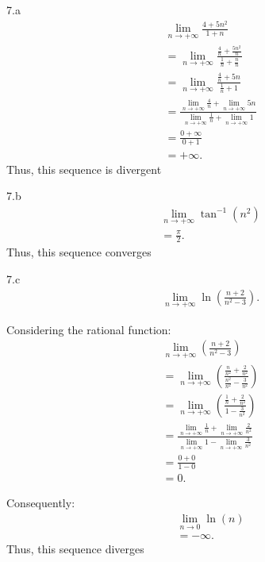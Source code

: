 \documentclass{report}
\begin{document}
    \bigbreak \noindent 
    7.a
    \begin{align*}
        &\lim\limits_{n \to +\infty}{\frac{4+5n^{2}}{1+n}} \\
        &=\lim\limits_{n \to +\infty}{\frac{\frac{4}{n}+\frac{5n^{2}}{n}}{\frac{1}{n} + \frac{n}{n}}} \\
        &=\lim\limits_{n \to +\infty}{\frac{\frac{4}{n}+5n}{\frac{1}{n}+1}} \\
        &= \frac{\lim\limits_{n \to +\infty}{\frac{4}{n}}+\lim\limits_{n \to +\infty}{5n}}{\lim\limits_{n \to +\infty}{\frac{1}{n}} + \lim\limits_{n \to +\infty}{1}} \\
        &= \frac{0 + \infty}{0 + 1} \\
        &=+\infty
    .\end{align*}
    Thus, this sequence is divergent

    \bigbreak \noindent 
    7.b
    \begin{align*}
        &\lim\limits_{n \to +\infty}{\tan^{-1}{(n^{2})}} \\
        &=\frac{\pi}{2}
    .\end{align*}
    \bigbreak \noindent 
    Thus, this sequence converges

    \bigbreak \noindent 
    7.c
    \begin{align*}
        &\lim\limits_{n \to +\infty}{\ln{\left(\frac{n+2}{n^{2}-3}\right)}} 
    .\end{align*}
    \begin{minipage}[t]{0.47\textwidth}
        Considering the rational function: 
        \begin{align*}
        &\lim\limits_{n \to +\infty}{\left(\frac{n+2}{n^{2}-3}\right)} \\
        &=\lim\limits_{n \to +\infty}{\left(\frac{\frac{n}{n^{2}}+\frac{2}{n^{2}}}{\frac{n^{2}}{n^{2}}-\frac{3}{n^{2}}}\right)} \\
        &=\lim\limits_{n \to +\infty}{\left(\frac{\frac{1}{n}+\frac{2}{n^{2}}}{1-\frac{3}{n^{2}}}\right)}\\
        &= \frac{\lim\limits_{n \to +\infty}{\frac{1}{n}}+\lim\limits_{n \to +\infty}{\frac{2}{n^{2}}}}{\lim\limits_{n \to +\infty}{1}-\lim\limits_{n \to +\infty}{\frac{3}{n^{2}}}} \\
        &=\frac{0+0}{1-0} \\
        &=0
    .\end{align*}
    \end{minipage}
    \begin{minipage}[t]{0.47\textwidth}
        Consequently:
        \begin{align*}
            &\lim\limits_{n \to 0}{\ln{(n)}} \\
            &= -\infty
        .\end{align*}
    Thus, this sequence diverges
    \end{minipage}
    \bigbreak \noindent 
\end{document}
